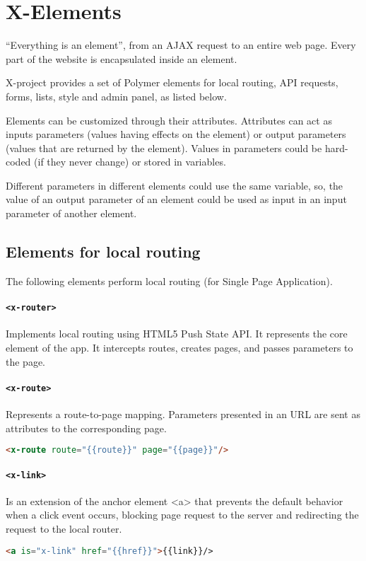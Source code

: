 \section{X-Elements}
\label{sec:XPR_xel}

``Everything is an element'', from an AJAX request to an entire web page. Every part of the website is encapsulated inside an element.

X-project provides a set of Polymer elements for local routing, API requests, forms, lists, style and admin panel, as listed below.

Elements can be customized through their attributes. Attributes can act as inputs parameters (values having effects on the element) or output parameters (values that are returned by the element). Values in parameters could be hard-coded (if they never change) or stored in variables.

Different parameters in different elements could use the same variable, so, the value of an output parameter of an element could be used as input in an input parameter of another element.

\subsection{Elements for local routing}

The following elements perform local routing (for Single Page Application).
\paragraph{\texttt{<x-router>}} Implements local routing using HTML5 Push State API. It represents the core element of the app. It intercepts routes, creates pages, and passes parameters to the page.
\paragraph{\texttt{<x-route>}} Represents a route-to-page mapping. Parameters presented in an URL are sent as attributes to the corresponding page.
\begin{lstlisting}[language=html]
<x-route route="{{route}}" page="{{page}}"/>
\end{lstlisting}
\paragraph{\texttt{<x-link>}} Is an extension of the anchor element <a> that prevents the default behavior when a click event occurs, blocking page request to the server and redirecting the request to the local router.
\begin{lstlisting}[language=html]
<a is="x-link" href="{{href}}">{{link}}/>
\end{lstlisting}

